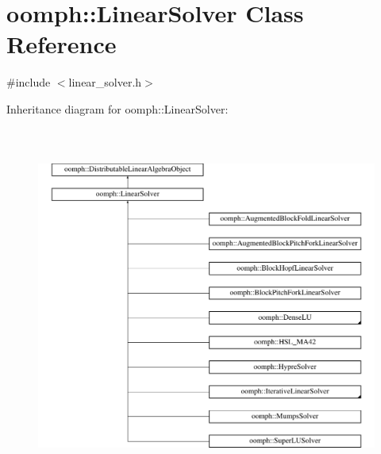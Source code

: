\hypertarget{classoomph_1_1LinearSolver}{}\section{oomph\+:\+:Linear\+Solver Class Reference}
\label{classoomph_1_1LinearSolver}


{\ttfamily \#include $<$linear\+\_\+solver.\+h$>$}

Inheritance diagram for oomph\+:\+:Linear\+Solver\+:\begin{figure}[H]
\begin{center}
\leavevmode
\includegraphics[height=11.830986cm]{classoomph_1_1LinearSolver}
\end{center}
\end{figure}
